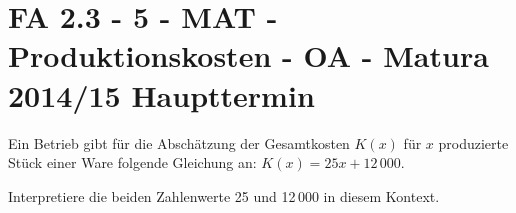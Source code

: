 \section{FA 2.3 - 5 - MAT - Produktionskosten - OA - Matura 2014/15 Haupttermin}

\begin{beispiel}[FA 2.3]{1} %
Ein Betrieb gibt für die Abschätzung der Gesamtkosten $K(x)$ für $x$ produzierte Stück einer Ware folgende Gleichung an: $K(x) = 25x + 12\,000$. \leer

Interpretiere die beiden Zahlenwerte 25 und 12\,000 in diesem Kontext.


\end{beispiel}